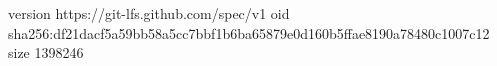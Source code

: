 version https://git-lfs.github.com/spec/v1
oid sha256:df21dacf5a59bb58a5cc7bbf1b6ba65879e0d160b5ffae8190a78480c1007c12
size 1398246
